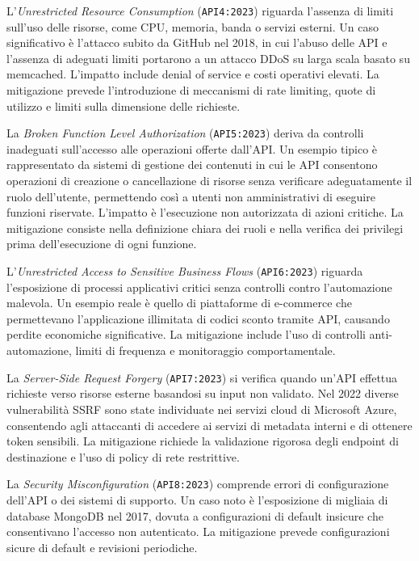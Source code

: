 L’\emph{Unrestricted Resource Consumption} (\texttt{API4:2023}) riguarda l’assenza di limiti sull’uso delle risorse, come CPU, memoria, banda o servizi esterni. Un caso significativo è l’attacco subito da GitHub nel 2018, in cui l’abuso delle API e l’assenza di adeguati limiti portarono a un attacco DDoS su larga scala basato su memcached. L’impatto include denial of service e costi operativi elevati. La mitigazione prevede l’introduzione di meccanismi di rate limiting, quote di utilizzo e limiti sulla dimensione delle richieste.

La \emph{Broken Function Level Authorization} (\texttt{API5:2023}) deriva da controlli inadeguati sull’accesso alle operazioni offerte dall’API. Un esempio tipico è rappresentato da sistemi di gestione dei contenuti in cui le API consentono operazioni di creazione o cancellazione di risorse senza verificare adeguatamente il ruolo dell’utente, permettendo così a utenti non amministrativi di eseguire funzioni riservate. L’impatto è l’esecuzione non autorizzata di azioni critiche. La mitigazione consiste nella definizione chiara dei ruoli e nella verifica dei privilegi prima dell’esecuzione di ogni funzione.

L’\emph{Unrestricted Access to Sensitive Business Flows} (\texttt{API6:2023}) riguarda l’esposizione di processi applicativi critici senza controlli contro l’automazione malevola. Un esempio reale è quello di piattaforme di e-commerce che permettevano l’applicazione illimitata di codici sconto tramite API, causando perdite economiche significative. La mitigazione include l’uso di controlli anti-automazione, limiti di frequenza e monitoraggio comportamentale.

La \emph{Server-Side Request Forgery} (\texttt{API7:2023}) si verifica quando un’API effettua richieste verso risorse esterne basandosi su input non validato. Nel 2022 diverse vulnerabilità SSRF sono state individuate nei servizi cloud di Microsoft Azure, consentendo agli attaccanti di accedere ai servizi di metadata interni e di ottenere token sensibili. La mitigazione richiede la validazione rigorosa degli endpoint di destinazione e l’uso di policy di rete restrittive.

La \emph{Security Misconfiguration} (\texttt{API8:2023}) comprende errori di configurazione dell’API o dei sistemi di supporto. Un caso noto è l’esposizione di migliaia di database MongoDB nel 2017, dovuta a configurazioni di default insicure che consentivano l’accesso non autenticato. La mitigazione prevede configurazioni sicure di default e revisioni periodiche.

